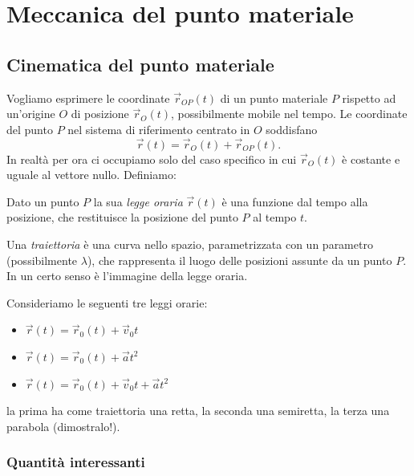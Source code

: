 \documentclass[11pt]{scrartcl}
\begin{document}
	\newpage
	\section{Meccanica del punto materiale}
	
	\subsection{Cinematica del punto materiale}
	
	Vogliamo esprimere le coordinate $\vec{r}_{OP}(t)$ di un punto materiale $P$ rispetto ad un'origine $O$ di posizione $\vec{r}_O(t)$, possibilmente mobile nel tempo. Le coordinate del punto $P$ nel sistema di riferimento centrato in $O$ soddisfano
	$$\vec{r}(t)=\vec{r}_O(t)+\vec{r}_{OP}(t).$$
	In realtà per ora ci occupiamo solo del caso specifico in cui $\vec{r}_O(t)$ è costante e uguale al vettore nullo. Definiamo:
	\begin{definition}
		Dato un punto $P$ la sua \textit{legge oraria} $\vec{r}(t)$ è una funzione dal tempo alla posizione, che restituisce la posizione del punto $P$ al tempo $t$. 
	\end{definition}
	\begin{definition}[Traiettoria]
		Una \textit{traiettoria} è una curva nello spazio, parametrizzata con un parametro (possibilmente $\lambda$), che rappresenta il luogo delle posizioni assunte da un punto $P$. In un certo senso è l'immagine della legge oraria.
	\end{definition}
	\begin{example}
		Consideriamo le seguenti tre leggi orarie:
		\begin{itemize}
			\item $\vec{r}(t)=\vec{r}_0(t)+\vec{v}_0 t$
			\item $\vec{r}(t)=\vec{r}_0(t)+\vec{a} t^2$
			\item $\vec{r}(t)=\vec{r}_0(t)+\vec{v}_0 t+\vec{a} t^2$
		\end{itemize} 
		la prima ha come traiettoria una retta, la seconda una semiretta, la terza una parabola (dimostralo!).
	\end{example}
	\subsubsection{Quantità interessanti}
	
\end{document}
